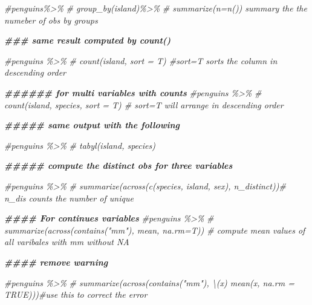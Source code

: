 \documentclass[
]{article}
\newenvironment{Shaded}{\begin{snugshade}}{\end{snugshade}}
\newcommand{\CommentTok}[1]{\textcolor[rgb]{0.56,0.35,0.01}{\textit{#1}}}
\newcommand{\DocumentationTok}[1]{\textcolor[rgb]{0.56,0.35,0.01}{\textbf{\textit{#1}}}}
\begin{document}
\begin{Shaded}
\begin{Highlighting}[]
\CommentTok{\#penguins\%\textgreater{}\%}
\CommentTok{\#  group\_by(island)\%\textgreater{}\%}
\CommentTok{\#  summarize(n=n()) summary the the numeber of obs by groups}

\DocumentationTok{\#\#\# same result computed by count()}

\CommentTok{\#penguins \%\textgreater{}\% }
\CommentTok{\#  count(island, sort = T) \#sort=T sorts the column in descending order}




\DocumentationTok{\#\#\#\#\#\# for multi variables with counts}
\CommentTok{\#penguins \%\textgreater{}\% }
\CommentTok{\#  count(island, species, sort = T) \# sort=T will arrange in descending order}

\DocumentationTok{\#\#\#\#\# same output with the following}

\CommentTok{\#penguins \%\textgreater{}\%}
\CommentTok{\#  tabyl(island, species)}


\DocumentationTok{\#\#\#\#\# compute the distinct obs for three variables}

\CommentTok{\#penguins \%\textgreater{}\%}
\CommentTok{\#  summarize(across(c(species, island, sex), n\_distinct))\# n\_dis counts the number of unique}



\DocumentationTok{\#\#\#\# For continues variables}
\CommentTok{\#penguins \%\textgreater{}\%}
\CommentTok{\#  summarize(across(contains("mm"), mean, na.rm=T)) \# compute mean values of all varibales with \textquotesingle{}mm\textquotesingle{} without NA}

\DocumentationTok{\#\#\#\# remove warning }

\CommentTok{\#penguins \%\textgreater{}\%}
\CommentTok{\#  summarize(across(contains("mm"), \textbackslash{}(x) mean(x, na.rm = TRUE)))\#use this to correct the error}
\end{Highlighting}
\end{Shaded}
\end{document}
